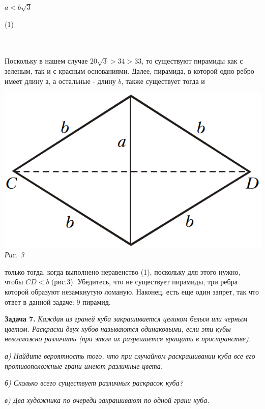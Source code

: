 {\begin{multicols}{3}
\begin{minipage}[b]{0.16666\textwidth}
\raggedleft
$a < b\sqrt{3}$
\end{minipage}%
\begin{minipage}[b]{0.12\textwidth}
\raggedleft
(1)
\end{minipage}%
\\ \\
Поскольку в нашем случае $20\sqrt{3} > 34 > 33$, то существуют пирамиды как
с зеленым, так и с красным
\vfill\null
\columnbreak
основаниями. Далее, пирамида, в которой одно ребро имеет длину $а$, а остальные -
длину $b$, также существует тогда и
\begin{minipage}{\linewidth}
\includegraphics[width=\linewidth]{images/picture3.png} \\
\textsl{Рис. 3} \\
\end{minipage}
только тогда, когда выполнено неравенство (1),
поскольку для этого нужно, чтобы
$CD < b$
(рис.3). Убедитесь, что не существует пирамиды, три ребра
которой образуют незамкнутую ломаную. Наконец, есть еще один запрет,
так что ответ в данной задаче: 9 пирамид.\par
\textbf{Задача 7.} \textsl{Каждая из граней куба закрашивается целиком
белым или черным цветом. Раскраски двух кубов называются одинаковыми,
если эти кубы невозможно различить (при этом их разрешается
вращать в пространстве).} \par
\textsl{а) Найдите вероятность того, что при случайном раскрашивании куба все
его противоположные грани имеют различные цвета.} \par
\textsl{б) Сколько всего существует различных раскрасок куба?} \par
\textsl{в) Два художника по очереди закрашивают по одной грани куба.
}
\end{multicols}}
